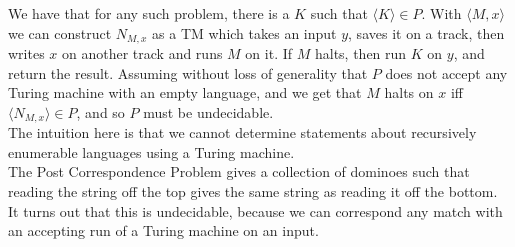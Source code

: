 \documentclass{tikzposter} %
\newtheorem{theorem}{Theorem}
\newtheorem{definition}{Definition}
\begin{document}
\begin{columns}
{      We have that for any such problem, there is a $K$ such that $\langle K \rangle \in P$. With $\langle M, x \rangle$ we can construct $N_{M,x}$ as a TM which takes an input $y$, saves it on a track, then writes $x$ on another track and runs $M$ on it. If $M$ halts, then run $K$ on $y$, and return the result. Assuming without loss of generality that $P$ does not accept any Turing machine with an empty language, and we get that $M$ halts on $x$ iff $\langle N_{M,x} \rangle \in P$, and so $P$ must be undecidable. \\

      The intuition here is that we cannot determine statements about recursively enumerable languages using a Turing machine. \\

      The Post Correspondence Problem gives a collection of dominoes such that reading the string off the top gives the same string as reading it off the bottom. It turns out that this is undecidable, because we can correspond any match with an accepting run of a Turing machine on an input. \\

      }
\end{columns}
\end{document}
